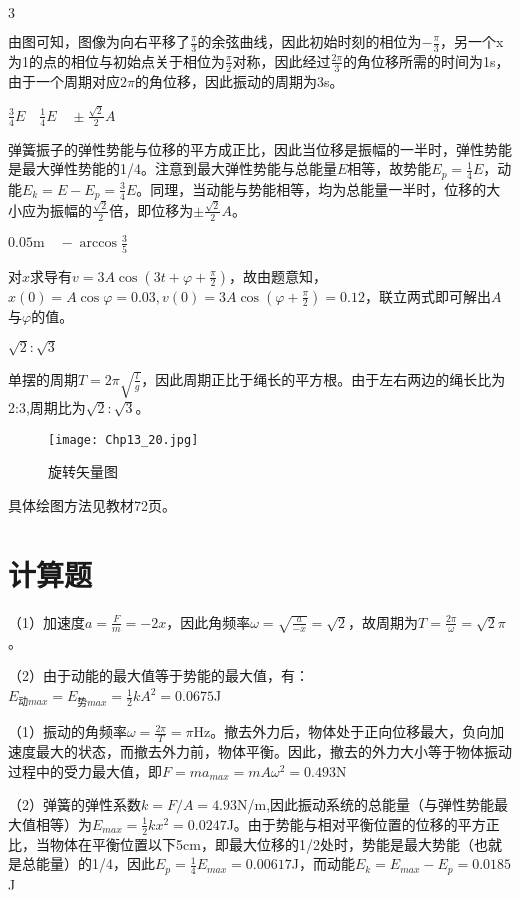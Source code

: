 \exercise $3$

\solve
由图可知，图像为向右平移了$\frac{\pi}{3}$的余弦曲线，因此初始时刻的相位为$-\frac{\pi}{3}$，另一个x为1的点的相位与初始点关于相位为$\frac{\pi}{2}$对称，因此经过$\frac{2\pi}{3}$的角位移所需的时间为1s，由于一个周期对应$2\pi$的角位移，因此振动的周期为3s。

\exercise $\frac{3}{4}E \quad \frac{1}{4}E \quad \pm\frac{\sqrt{2}}{2}A$

\solve
弹簧振子的弹性势能与位移的平方成正比，因此当位移是振幅的一半时，弹性势能是最大弹性势能的1/4。注意到最大弹性势能与总能量$E$相等，故势能$E_p=\frac{1}{4}E$，动能$E_k=E-E_p=\frac{3}{4}E$。同理，当动能与势能相等，均为总能量一半时，位移的大小应为振幅的$\frac{\sqrt{2}}{2}$倍，即位移为$\pm\frac{\sqrt{2}}{2}A$。

\exercise $0.05\mathrm{m}\quad -\arccos{\frac{3}{5}}$

\solve
对$x$求导有$v=3A\cos(3t+\varphi+\frac{\pi}{2})$，故由题意知，$x(0)=A\cos\varphi=0.03,v(0)=3A\cos(\varphi+\frac{\pi}{2})=0.12$，联立两式即可解出$A$与$\varphi$的值。

\exercise $\sqrt{2}:\sqrt{3}$

\solve
单摆的周期$T=2\pi\sqrt{\frac{l}{g}}$，因此周期正比于绳长的平方根。由于左右两边的绳长比为2:3,周期比为$\sqrt{2}:\sqrt{3}$。

\exercise

\solve
\begin{figure}[htb]
\centering
\texttt{[image: Chp13\_20.jpg]}
\caption{旋转矢量图}
\end{figure}
具体绘图方法见教材72页。

\section{计算题}
\exercise

\solve
（1）加速度$a=\frac{F}{m}=-2x$，因此角频率$\omega=\sqrt{\frac{a}{-x}}=\sqrt{2}$，故周期为$T=\frac{2\pi}{\omega}=\sqrt{2}\pi$。

（2）由于动能的最大值等于势能的最大值，有：$E_{\text{动}max}=E_{\text{势}max}=\frac{1}{2}kA^2=0.0675$J

\exercise

\solve
（1）振动的角频率$\omega=\frac{2\pi}{T}=\pi$Hz。撤去外力后，物体处于正向位移最大，负向加速度最大的状态，而撤去外力前，物体平衡。因此，撤去的外力大小等于物体振动过程中的受力最大值，即$F=ma_{max}=mA\omega^2=0.493$N

（2）弹簧的弹性系数$k=F/A=4.93$N/m,因此振动系统的总能量（与弹性势能最大值相等）为$E_{max}=\frac{1}{2}kx^2=0.0247$J。由于势能与相对平衡位置的位移的平方正比，当物体在平衡位置以下5cm，即最大位移的1/2处时，势能是最大势能（也就是总能量）的1/4，因此$E_p=\frac{1}{4}E_{max}=0.00617$J，而动能$E_ k=E_{max}-E_ p=0.0185$J

